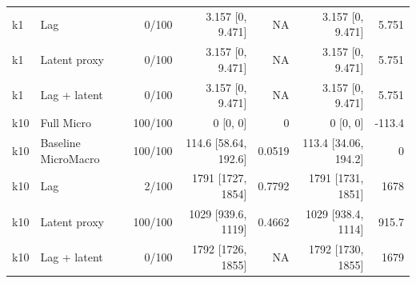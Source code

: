 \begin{landscape}
\begin{longtable}{llrrrrr}
k1 & Lag & 0/100 & 3.157 [0, 9.471] & NA & 3.157 [0, 9.471] & 5.751 \\
k1 & Latent proxy & 0/100 & 3.157 [0, 9.471] & NA & 3.157 [0, 9.471] & 5.751 \\
k1 & Lag + latent & 0/100 & 3.157 [0, 9.471] & NA & 3.157 [0, 9.471] & 5.751 \\
k10 & Full Micro & 100/100 & 0 [0, 0] & 0 & 0 [0, 0] & -113.4 \\
k10 & Baseline MicroMacro & 100/100 & 114.6 [58.64, 192.6] & 0.0519 & 113.4 [34.06, 194.2] & 0 \\
k10 & Lag & 2/100 & 1791 [1727, 1854] & 0.7792 & 1791 [1731, 1851] & 1678 \\
k10 & Latent proxy & 100/100 & 1029 [939.6, 1119] & 0.4662 & 1029 [938.4, 1114] & 915.7 \\
k10 & Lag + latent & 0/100 & 1792 [1726, 1855] & NA & 1792 [1730, 1855] & 1679 \\
\bottomrule
\end{longtable}
\normalsize
\end{landscape}
